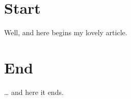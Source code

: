 \tableofcontents
\maketitle
\section{Start}
Well, and here begins my lovely article.
\section{End}
\ldots{} and here it ends.

